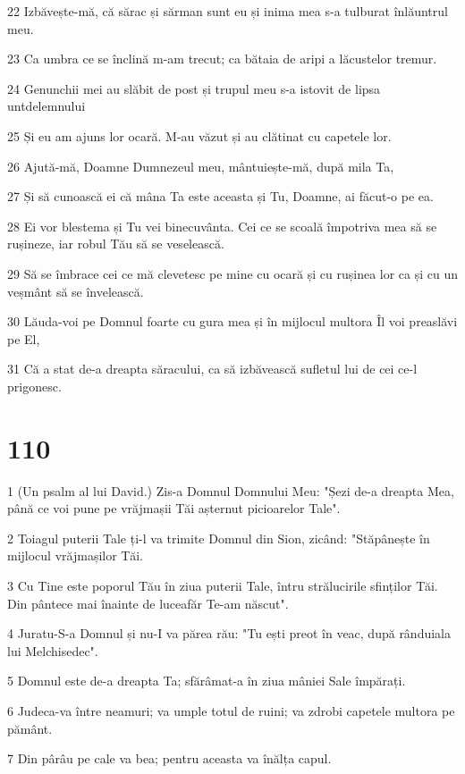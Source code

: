 \par 22 Izbăvește-mă, că sărac și sărman sunt eu și inima mea s-a tulburat înlăuntrul meu.
\par 23 Ca umbra ce se înclină m-am trecut; ca bătaia de aripi a lăcustelor tremur.
\par 24 Genunchii mei au slăbit de post și trupul meu s-a istovit de lipsa untdelemnului
\par 25 Și eu am ajuns lor ocară. M-au văzut și au clătinat cu capetele lor.
\par 26 Ajută-mă, Doamne Dumnezeul meu, mântuiește-mă, după mila Ta,
\par 27 Și să cunoască ei că mâna Ta este aceasta și Tu, Doamne, ai făcut-o pe ea.
\par 28 Ei vor blestema și Tu vei binecuvânta. Cei ce se scoală împotriva mea să se rușineze, iar robul Tău să se veselească.
\par 29 Să se îmbrace cei ce mă clevetesc pe mine cu ocară și cu rușinea lor ca și cu un veșmânt să se învelească.
\par 30 Lăuda-voi pe Domnul foarte cu gura mea și în mijlocul multora Îl voi preaslăvi pe El,
\par 31 Că a stat de-a dreapta săracului, ca să izbăvească sufletul lui de cei ce-l prigonesc.

\chapter{110}

\par 1 (Un psalm al lui David.) Zis-a Domnul Domnului Meu: "Șezi de-a dreapta Mea, până ce voi pune pe vrăjmașii Tăi așternut picioarelor Tale".
\par 2 Toiagul puterii Tale ți-l va trimite Domnul din Sion, zicând: "Stăpânește în mijlocul vrăjmașilor Tăi.
\par 3 Cu Tine este poporul Tău în ziua puterii Tale, întru strălucirile sfinților Tăi. Din pântece mai înainte de luceafăr Te-am născut".
\par 4 Juratu-S-a Domnul și nu-I va părea rău: "Tu ești preot în veac, după rânduiala lui Melchisedec".
\par 5 Domnul este de-a dreapta Ta; sfărâmat-a în ziua mâniei Sale împărați.
\par 6 Judeca-va între neamuri; va umple totul de ruini; va zdrobi capetele multora pe pământ.
\par 7 Din pârâu pe cale va bea; pentru aceasta va înălța capul.

